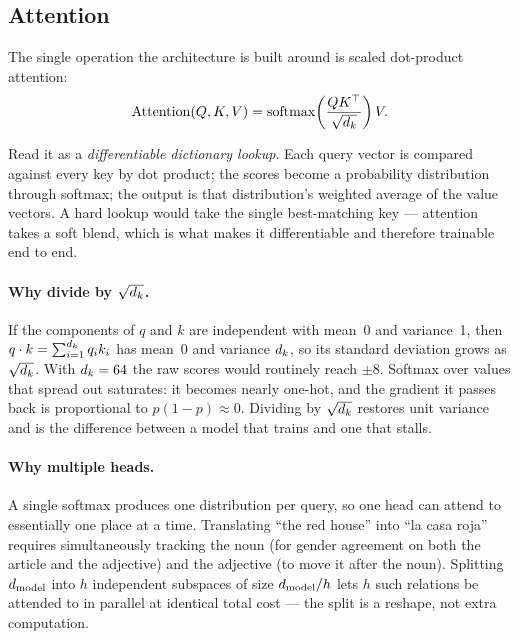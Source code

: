 \documentclass[11pt,a4paper]{article}
\begin{document}

\subsection{Attention}

The single operation the architecture is built around is scaled dot-product
attention:
\begin{equation}
\mathrm{Attention}(Q, K, V) =
  \mathrm{softmax}\!\left(\frac{QK^{\top}}{\sqrt{d_k}}\right)V .
\label{eq:attention}
\end{equation}

Read it as a \emph{differentiable dictionary lookup}. Each query vector is
compared against every key by dot product; the scores become a probability
distribution through softmax; the output is that distribution's weighted
average of the value vectors. A hard lookup would take the single best-matching
key --- attention takes a soft blend, which is what makes it differentiable and
therefore trainable end to end.

\paragraph{Why divide by $\sqrt{d_k}$.} If the components of $q$ and $k$ are
independent with mean~0 and variance~1, then $q \cdot k = \sum_{i=1}^{d_k} q_i
k_i$ has mean~0 and variance $d_k$, so its standard deviation grows as
$\sqrt{d_k}$. With $d_k = 64$ the raw scores would routinely reach $\pm 8$.
Softmax over values that spread out saturates: it becomes nearly one-hot, and
the gradient it passes back is proportional to $p(1-p) \approx 0$. Dividing by
$\sqrt{d_k}$ restores unit variance and is the difference between a model that
trains and one that stalls.


\paragraph{Why multiple heads.} A single softmax produces one distribution per
query, so one head can attend to essentially one place at a time. Translating
``the red house'' into ``la casa roja'' requires simultaneously tracking the
noun (for gender agreement on both the article and the adjective) and the
adjective (to move it after the noun). Splitting $d_{\mathrm{model}}$ into $h$ independent
subspaces of size $d_{\mathrm{model}}/h$ lets $h$ such relations be attended to in
parallel at identical total cost --- the split is a reshape, not extra
computation.
\end{document}

